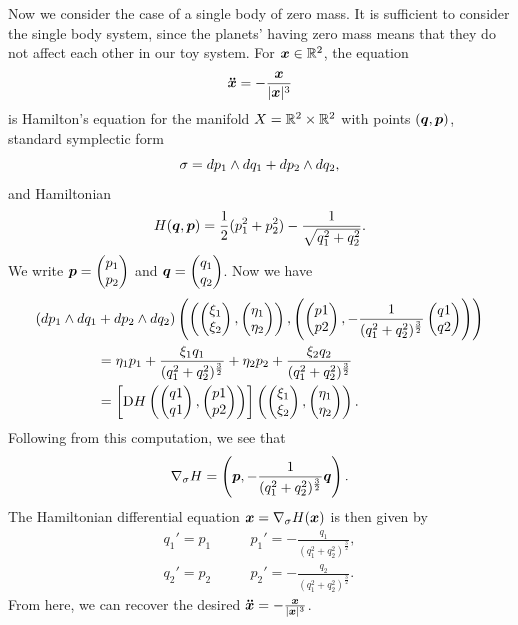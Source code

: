 \documentclass[twoside,letterpaper,10pt]{article}
\newcommand{\sgrad}{\nabla_{\sigma}}
\numberwithin{equation}{section}
\begin{document}
Now we consider the case of a single body of zero mass.
It is sufficient to consider the single body system, since the planets' having
zero mass means that they do not affect each other in our toy system.
For $\bm{x} \in \mathbb{R}^2$, the equation
\begin{equation*}
  \bm{\ddot{x}} = - \frac{\bm{x}}{|\bm{x}|^3}
\end{equation*}
is Hamilton's equation for the manifold $X = \mathbb{R}^2 \times \mathbb{R}^2$ with points
$(\bm{q}, \bm{p})$, standard symplectic form
\begin{equation*}
  \sigma = \mathop{}\!d p_1 \wedge \mathop{}\!d q_1 + \mathop{}\!d p_2 \wedge \mathop{}\!d q_2,
\end{equation*}
and Hamiltonian
\begin{equation*}
  H(\bm{q}, \bm{p}) = \frac{1}{2} (p_1^2 + p_2^2) - \frac{1}{\sqrt{q_1^2 +
      q_2^2}}.
\end{equation*}
We write $\bp{p} = \pt{p_1\\ p_2}$ and $\bp{q} = \pt{q_1\\q_2}$.
Now we have
\begin{align*}
  (\dif p_1 \wedge \dif q_1 &+ \dif p_2 \wedge \dif q_2)
                              \left(\left(\pt{\xi_1\\\xi_2}, \pt{\eta_1\\\eta_2}
  \right), \left( \pt{p1\\p2}, - \frac{1}{(q_1^2 + q_2^2)^{\frac{3}{2}}}
  \pt{q1\\q2} \right)\right)\\
                            &= \eta_1 p_1 + \frac{\xi_1 q_1}{(q_1^2 +
                              q_2^2)^{\frac{3}{2}}} + \eta_2 p_2 + \frac{\xi_2
                              q_2}{(q_1^2 + q_2^2)^{\frac{3}{2}}}\\
                            &= \left[ \Dif H \left( \pt{q1\\q1}, \pt{p1\\p2}
  \right) \right] \left( \pt{\xi_1\\\xi_2}, \pt{\eta_1\\\eta_2} \right).
\end{align*}
Following from this computation, we see that
\begin{equation*}
  \sgrad H = \left(\bp{p}, - \frac{1}{(q_1^2 + q_2^2)^{\frac{3}{2}}}\bp{q}
  \right).
\end{equation*}
The Hamiltonian differential equation $\bp{x} = \sgrad H(\bp{x})$ is then given
by
\begin{align*}
  q_1' = p_1 &\qquad p_1' = - \frac{q_1}{(q_1^2 + q_2^2)^{\frac{3}{2}}},\\
  q_2' = p_2 &\qquad p_2' = -\frac{q_2}{(q_1^2 + q_2^2)^{\frac{3}{2}}}.
\end{align*}
From here, we can recover the desired $\bm{\ddot{x}} = - \frac{\bm{x}}{|\bm{x}|^3}$.
\end{document}
